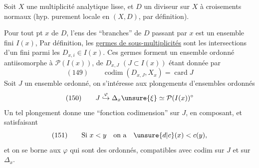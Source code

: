 Soit $X$ une multiplicité analytique lisse, et $D$ un diviseur sur $X$ à croisements normaux (hyp. purement locale en $(X,D)$, par définition). 

Pour tout pt $x$ de $D$, l'ens des ``branches'' de $D$ passant par $x$ est un ensemble fini $I(x)$, Par définition, les \uline{germes  de sous-multiplicités}   sont les intersections d'un  fini  parmi les $D_{x,i}\in I(x)$.
Ces germes forment un ensemble ordonné  antiisomorphe à $\mathcal P(I(x))$,   de $D_{x,J}$ $(J\subset I(x))$ étant donnée par
\[
(149)\qquad \operatorname{codim}(D_{x,J},X_x)=\operatorname{card}J
\]
Soit $J$ un ensemble ordonné, on s'intéresse aux plongements d'ensembles ordonnés
\[
(150)\qquad J\mathrel{\overset{\varphi}{\hookrightarrow}}\Delta_x\unsure{\xi}\simeq\mathcal P(I(x))^\circ
\]
Un tel plongement donne une ``fonction codimension'' sur $J$, en composant,  et  satisfaisant
\[
(151)\qquad\text{Si }x<y\quad\text{on a}\quad\unsure{d|c}(x)<c(y),
\]
et on se borne aux $\varphi$ qui sont des  ordonnés, compatibles avec  codim sur $J$ et sur $\Delta_x$.

